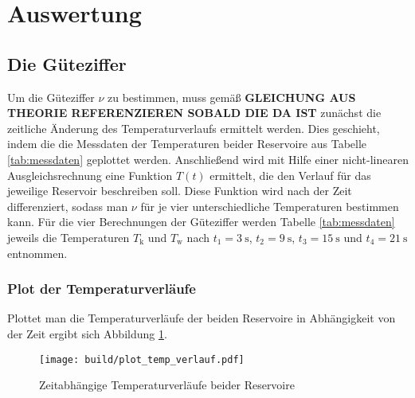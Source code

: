 \section{Auswertung}

\subsection{Die Güteziffer}
Um die Güteziffer $\nu$ zu bestimmen, muss gemäß \textbf{GLEICHUNG AUS THEORIE REFERENZIEREN SOBALD DIE DA IST} zunächst
die zeitliche Änderung des Temperaturverlaufs ermittelt werden.
Dies geschieht, indem die die Messdaten der Temperaturen beider Reservoire aus Tabelle \ref{tab:messdaten} geplottet werden.
Anschließend wird mit Hilfe einer nicht-linearen Ausgleichsrechnung eine Funktion $T \left(t\right)$ ermittelt, die den Verlauf 
für das jeweilige Reservoir beschreiben soll.
Diese Funktion wird nach der Zeit differenziert, sodass man $\nu$ für je vier unterschiedliche Temperaturen bestimmen kann.
Für die vier Berechnungen der Güteziffer werden Tabelle \ref{tab:messdaten} jeweils die Temperaturen $T_{\text{k}}$ und $T_{\text{w}}$ nach 
$t_1 = \qty[]{3}{\s}$, $t_2 = \qty[]{9}{\s}$, $t_3 = \qty[]{15}{\s}$ und $t_4 = \qty[]{21}{\s}$ entnommen.


\subsubsection{Plot der Temperaturverläufe}
Plottet man die Temperaturverläufe der beiden Reservoire in Abhängigkeit von der Zeit ergibt sich Abbildung \ref{fig:temperaturverlauf}.

\begin{figure}
    \texttt{[image: build/plot\_temp\_verlauf.pdf]}
    \caption[]{Zeitabhängige Temperaturverläufe beider Reservoire}
    \label{fig:temperaturverlauf}
\end{figure}


